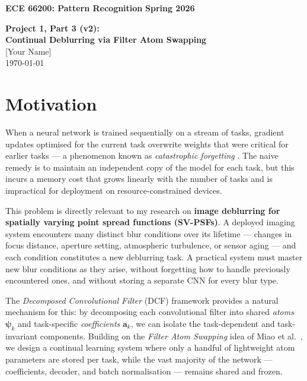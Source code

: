 \documentclass[11pt,letterpaper]{article}
\newcommand{\avec}{\mathbf{a}}
\newcommand{\psivec}{\boldsymbol{\psi}}
\begin{document}
\noindent \textbf{ECE 66200: Pattern Recognition} \hfill \textbf{Spring 2026} \\
\vspace{1cm}

\begin{center}
    {\Large \textbf{Project 1, Part 3 (v2):\\
    Continual Deblurring via Filter Atom Swapping}} \\
    \vspace{0.5cm}
    {\large [Your Name]} \\
    \vspace{0.3cm}
    {\large \today}
\end{center}
\vspace{0.5cm}

\section{Motivation}
\label{sec:motivation}

When a neural network is trained sequentially on a stream of tasks, gradient
updates optimised for the current task overwrite weights that were critical for
earlier tasks --- a phenomenon known as \emph{catastrophic forgetting}
\cite{french1999catastrophic}.  The naive remedy is to maintain an independent
copy of the model for each task, but this incurs a memory cost that grows
linearly with the number of tasks and is impractical for deployment on
resource-constrained devices.

This problem is directly relevant to my research on \textbf{image deblurring
for spatially varying point spread functions (SV-PSFs)}.  A deployed imaging
system encounters many distinct blur conditions over its lifetime --- changes
in focus distance, aperture setting, atmospheric turbulence, or sensor aging
--- and each condition constitutes a new deblurring task.  A practical system
must master new blur conditions as they arise, without forgetting how to handle
previously encountered ones, and without storing a separate CNN for every blur
type.

The \emph{Decomposed Convolutional Filter} (DCF) framework
\cite{qiu2018dcfnet} provides a natural mechanism for this: by decomposing
each convolutional filter into shared \emph{atoms} $\psivec_k$ and
task-specific \emph{coefficients} $\avec_k$, we can isolate the task-dependent
and task-invariant components.  Building on the \emph{Filter Atom Swapping}
idea of Miao et al.\ \cite{miao2021continual}, we design a continual learning
system where only a handful of lightweight atom parameters are stored per task,
while the vast majority of the network --- coefficients, decoder, and batch
normalisation --- remains shared and frozen.
\end{document}
